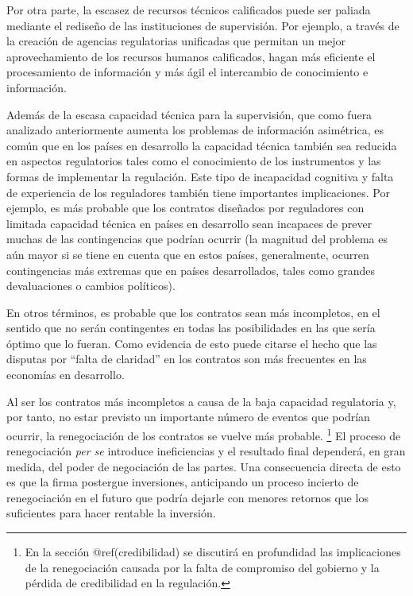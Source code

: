 \documentclass[
  12pt,
  spanish,
]{book}
\begin{document}
Por otra parte, la escasez de recursos técnicos calificados puede ser
paliada mediante el rediseño de las instituciones de supervisión. Por
ejemplo, a través de la creación de agencias regulatorias unificadas que
permitan un mejor aprovechamiento de los recursos humanos calificados,
hagan más eficiente el procesamiento de información y más ágil el
intercambio de conocimiento e información.

Además de la escasa capacidad técnica para la supervisión, que como
fuera analizado anteriormente aumenta los problemas de información
asimétrica, es común que en los países en desarrollo la capacidad
técnica también sea reducida en aspectos regulatorios tales como el
conocimiento de los instrumentos y las formas de implementar la
regulación. Este tipo de incapacidad cognitiva y falta de experiencia de
los reguladores también tiene importantes implicaciones. Por ejemplo, es
más probable que los contratos diseñados por reguladores con limitada
capacidad técnica en países en desarrollo sean incapaces de prever
muchas de las contingencias que podrían ocurrir (la magnitud del
problema es aún mayor si se tiene en cuenta que en estos países,
generalmente, ocurren contingencias más extremas que en países
desarrollados, tales como grandes devaluaciones o cambios políticos).

En otros términos, es probable que los contratos sean más incompletos,
en el sentido que no serán contingentes en todas las posibilidades en
las que sería óptimo que lo fueran. Como evidencia de esto puede citarse
el hecho que las disputas por ``falta de claridad'' en los contratos son
más frecuentes en las economías en desarrollo.

Al ser los contratos más incompletos a causa de la baja capacidad
regulatoria y, por tanto, no estar previsto un importante número de
eventos que podrían ocurrir, la renegociación de los contratos se vuelve
más probable. \footnote{En la sección @ref(credibilidad) se discutirá en
  profundidad las implicaciones de la renegociación causada por la falta
  de compromiso del gobierno y la pérdida de credibilidad en la
  regulación.} El proceso de renegociación \emph{per se} introduce
ineficiencias y el resultado final dependerá, en gran medida, del poder
de negociación de las partes. Una consecuencia directa de esto es que la
firma postergue inversiones, anticipando un proceso incierto de
renegociación en el futuro que podría dejarle con menores retornos que
los suficientes para hacer rentable la inversión.
\end{document}

